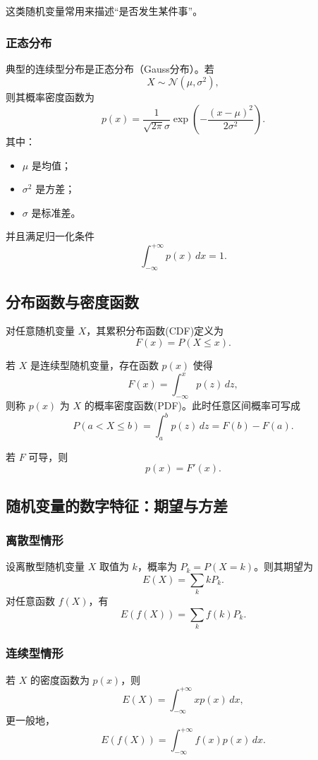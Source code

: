 这类随机变量常用来描述``是否发生某件事''。

\subsubsection{正态分布}

典型的连续型分布是正态分布（Gauss分布）。若
\[
X\sim \mathcal{N}(\mu,\sigma^2),
\]
则其概率密度函数为
\[
p(x)=\frac{1}{\sqrt{2\pi}\sigma}\exp\left(-\frac{(x-\mu)^2}{2\sigma^2}\right).
\]
其中：
\begin{itemize}
    \item \(\mu\) 是均值；
    \item \(\sigma^2\) 是方差；
    \item \(\sigma\) 是标准差。
\end{itemize}

并且满足归一化条件
\[
\int_{-\infty}^{+\infty} p(x)\,dx=1.
\]

\subsection{分布函数与密度函数}

对任意随机变量 \(X\)，其累积分布函数(CDF)定义为
\[
F(x)=P(X\le x).
\]

若 \(X\) 是连续型随机变量，存在函数 \(p(x)\) 使得
\[
F(x)=\int_{-\infty}^{x} p(z)\,dz,
\]
则称 \(p(x)\) 为 \(X\) 的概率密度函数(PDF)。此时任意区间概率可写成
\[
P(a<X\le b)=\int_a^b p(z)\,dz = F(b)-F(a).
\]

若 \(F\) 可导，则
\[
p(x)=F'(x).
\]

\subsection{随机变量的数字特征：期望与方差}

\subsubsection{离散型情形}

设离散型随机变量 \(X\) 取值为 \(k\)，概率为 \(P_k=P(X=k)\)。则其期望为
\[
E(X)=\sum_k kP_k.
\]
对任意函数 \(f(X)\)，有
\[
E(f(X))=\sum_k f(k)P_k.
\]

\subsubsection{连续型情形}

若 \(X\) 的密度函数为 \(p(x)\)，则
\[
E(X)=\int_{-\infty}^{+\infty} xp(x)\,dx,
\]
更一般地，
\[
E(f(X))=\int_{-\infty}^{+\infty} f(x)p(x)\,dx.
\]

